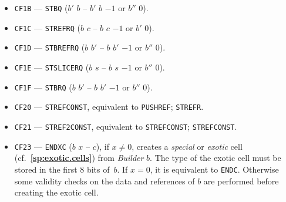 \documentclass[12pt,oneside]{article}
\def\refpoint#1{{\rm\textbf{\ref{#1}}}}
\let\ptref=\refpoint
\begin{document}
\begin{itemize}
\item {\tt CF1B} --- {\tt STBQ} ($b'$ $b$ -- $b'$ $b$ $-1$ or $b''$ $0$).
\item {\tt CF1C} --- {\tt STREFRQ} ($b$ $c$ -- $b$ $c$ $-1$ or $b'$ $0$).
\item {\tt CF1D} --- {\tt STBREFRQ} ($b$ $b'$ -- $b$ $b'$ $-1$ or $b''$ $0$).
\item {\tt CF1E} --- {\tt STSLICERQ} ($b$ $s$ -- $b$ $s$ $-1$ or $b''$ $0$).
\item {\tt CF1F} --- {\tt STBRQ} ($b$ $b'$ -- $b$ $b'$ $-1$ or $b''$ $0$).
\item {\tt CF20} --- {\tt STREFCONST}, equivalent to {\tt PUSHREF}; {\tt STREFR}.
\item {\tt CF21} --- {\tt STREF2CONST}, equivalent to {\tt STREFCONST}; {\tt STREFCONST}.
\item {\tt CF23} --- {\tt ENDXC} ($b$ $x$ -- $c$), if $x\neq0$, creates a {\em special\/} or {\em exotic\/} cell (cf.~\ptref{sp:exotic.cells}) from {\em Builder\/} $b$. The type of the exotic cell must be stored in the first 8 bits of~$b$. If $x=0$, it is equivalent to {\tt ENDC}. Otherwise some validity checks on the data and references of $b$ are performed before creating the exotic cell.


\end{itemize}
\end{document}
